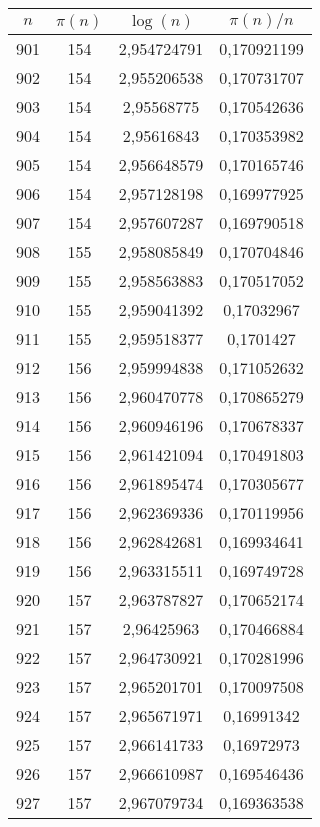 {\begin{minipage}[!h]{0.45\textwidth}\centering
\tiny
\begin{longtable}{cccc} \hline
\(n\) & \(\pi(n)\) & \(\log(n)\) & \(\pi(n)/n\) \\ \hline
901 & 154 & 2,954724791 & 0,170921199 \\ \hline
902 & 154 & 2,955206538 & 0,170731707 \\ \hline
903 & 154 & 2,95568775 & 0,170542636 \\ \hline
904 & 154 & 2,95616843 & 0,170353982 \\ \hline
905 & 154 & 2,956648579 & 0,170165746 \\ \hline
906 & 154 & 2,957128198 & 0,169977925 \\ \hline
907 & 154 & 2,957607287 & 0,169790518 \\ \hline
908 & 155 & 2,958085849 & 0,170704846 \\ \hline
909 & 155 & 2,958563883 & 0,170517052 \\ \hline
910 & 155 & 2,959041392 & 0,17032967 \\ \hline
911 & 155 & 2,959518377 & 0,1701427 \\ \hline
912 & 156 & 2,959994838 & 0,171052632 \\ \hline
913 & 156 & 2,960470778 & 0,170865279 \\ \hline
914 & 156 & 2,960946196 & 0,170678337 \\ \hline
915 & 156 & 2,961421094 & 0,170491803 \\ \hline
916 & 156 & 2,961895474 & 0,170305677 \\ \hline
917 & 156 & 2,962369336 & 0,170119956 \\ \hline
918 & 156 & 2,962842681 & 0,169934641 \\ \hline
919 & 156 & 2,963315511 & 0,169749728 \\ \hline
920 & 157 & 2,963787827 & 0,170652174 \\ \hline
921 & 157 & 2,96425963 & 0,170466884 \\ \hline
922 & 157 & 2,964730921 & 0,170281996 \\ \hline
923 & 157 & 2,965201701 & 0,170097508 \\ \hline
924 & 157 & 2,965671971 & 0,16991342 \\ \hline
925 & 157 & 2,966141733 & 0,16972973 \\ \hline
926 & 157 & 2,966610987 & 0,169546436 \\ \hline
927 & 157 & 2,967079734 & 0,169363538 \\ \hline

\end{longtable}
\end{minipage}}
